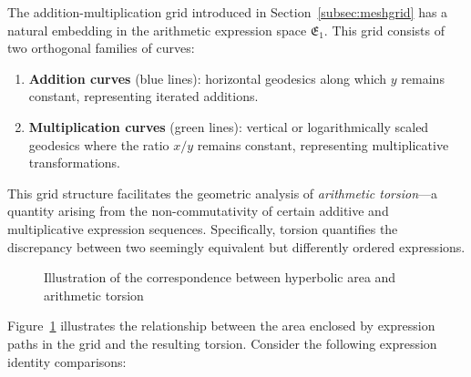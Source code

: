 The addition-multiplication grid introduced in Section~\ref{subsec:meshgrid} has a natural embedding in the arithmetic expression space $\mathfrak{E}_1$. This grid consists of two orthogonal families of curves:

\begin{enumerate}
    \item \textbf{Addition curves} (blue lines): horizontal geodesics along which $y$ remains constant, representing iterated additions.
    \item \textbf{Multiplication curves} (green lines): vertical or logarithmically scaled geodesics where the ratio $x/y$ remains constant, representing multiplicative transformations.
\end{enumerate}

This grid structure facilitates the geometric analysis of \emph{arithmetic torsion}—a quantity arising from the non-commutativity of certain additive and multiplicative expression sequences. Specifically, torsion quantifies the discrepancy between two seemingly equivalent but differently ordered expressions.

\begin{figure}[ht]
    \centering
    \caption{Illustration of the correspondence between hyperbolic area and arithmetic torsion}\label{fig:area-formula}
\end{figure}

Figure~\ref{fig:area-formula} illustrates the relationship between the area enclosed by expression paths in the grid and the resulting torsion. Consider the following expression identity comparisons:


